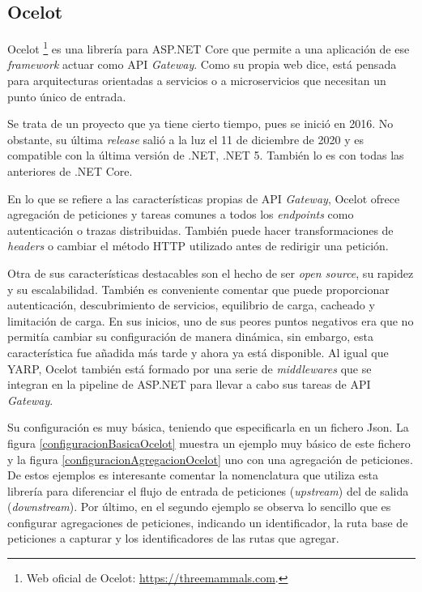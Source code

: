 \documentclass[11pt,spanish,listoffigures]{tfgetsinf}
\begin{document}

		\subsection{Ocelot}

Ocelot \footnote{Web oficial de Ocelot: \url{https://threemammals.com}.} es una librería para ASP.NET Core que permite a una aplicación de ese \emph{framework} actuar como API \emph{Gateway}. Como su propia web dice, está pensada para arquitecturas orientadas a servicios o a microservicios que necesitan un punto único de entrada.

Se trata de un proyecto que ya tiene cierto tiempo, pues se inició en 2016. No obstante, su última \emph{release} salió a la luz el 11 de diciembre de 2020 y es compatible con la última versión de .NET, .NET 5. También lo es con todas las anteriores de .NET Core.

En lo que se refiere a las características propias de API \emph{Gateway}, Ocelot ofrece agregación de peticiones y tareas comunes a todos los \emph{endpoints} como autenticación o trazas distribuidas. También puede hacer transformaciones de \emph{headers} o cambiar el método HTTP utilizado antes de redirigir una petición.

Otra de sus características destacables son el hecho de ser \emph{open source}, su rapidez y su escalabilidad. También es conveniente comentar que puede proporcionar autenticación, descubrimiento de servicios, equilibrio de carga, cacheado y limitación de carga. En sus inicios, uno de sus peores puntos negativos era que no permitía cambiar su configuración de manera dinámica, sin embargo, esta característica fue añadida más tarde y ahora ya está disponible. Al igual que YARP, Ocelot también está formado por una serie de \emph{middlewares} que se integran en la pipeline de ASP.NET para llevar a cabo sus tareas de API \emph{Gateway}.

Su configuración es muy básica, teniendo que especificarla en un fichero Json. La figura \ref{configuracionBasicaOcelot} muestra un ejemplo muy básico de este fichero y la figura \ref{configuracionAgregacionOcelot} uno con una agregación de peticiones. De estos ejemplos es interesante comentar la nomenclatura que utiliza esta librería para diferenciar el flujo de entrada de peticiones (\emph{upstream}) del de salida (\emph{downstream}). Por último, en el segundo ejemplo se observa lo sencillo que es configurar agregaciones de peticiones, indicando un identificador, la ruta base de peticiones a capturar y los identificadores de las rutas que agregar.
\end{document}
